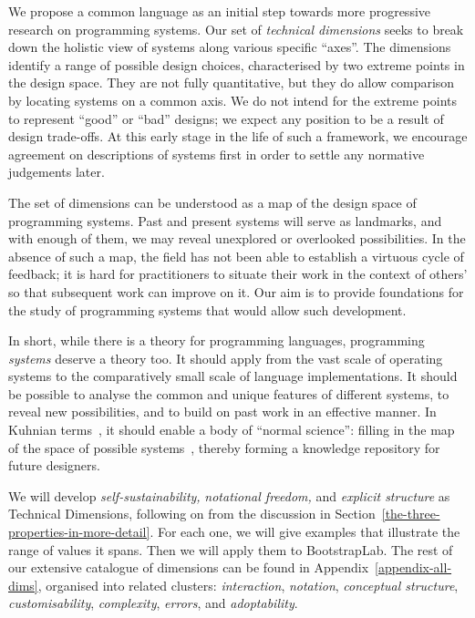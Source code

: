 \documentclass[ twoside,openright,titlepage,numbers=noenddot,headinclude,footinclude,cleardoublepage=empty,abstract=on,
                BCOR=5mm,paper=a4,fontsize=11pt
                ]{scrreprt}
\newcommand{\joel}[1]{}
\theoremstyle{definition}
\begin{document}
We propose a common language as an initial step towards more progressive
research on programming systems. Our set of \emph{technical dimensions}
seeks to break down the holistic view of systems along various specific
``axes''. The dimensions identify a range of possible design choices,
characterised by two extreme points in the design space. They are not
fully quantitative, but they do allow comparison by locating systems on
a common axis. We do not intend for the extreme points to represent
``good'' or ``bad'' designs; we expect any position to be a result of
design trade-offs. At this early stage in the life of such a framework,
we encourage agreement on descriptions of systems first in order to
settle any normative judgements later.

The set of dimensions can be understood as a map of the design space of
programming systems. Past and present systems will serve as landmarks,
and with enough of them, we may reveal unexplored or overlooked
possibilities. In the absence of such a map, the field has not been able
to establish a virtuous cycle of feedback; it is hard for practitioners
to situate their work in the context of others' so that subsequent work
can improve on it. Our aim is to provide foundations for the study of
programming systems that would allow such development.

In short, while there is a theory for programming languages, programming
\emph{systems} deserve a theory too. It should apply from the vast scale
of operating systems to the comparatively small scale of language
implementations. It should be possible to analyse the common and unique
features of different systems, to reveal new possibilities, and to build
on past work in an effective manner. In Kuhnian terms~\parencite{Kuhn},
it should enable a body of ``normal science'': filling in the map of the
space of possible systems~\joel{(Figure \ref{fig:tech-dims-diagram})},
thereby forming a knowledge repository for future designers.

\joel{CORRECTIONS NOTE: INCLUDE TECH DIMS DIAGRAM PICTURE FILE!!!}

We will develop \emph{self-sustainability,} \emph{notational freedom,}
and \emph{explicit structure} as Technical Dimensions, following on from
the discussion in Section~\ref{the-three-properties-in-more-detail}. For
each one, we will give examples that illustrate the range of values it
spans. Then we will apply them to BootstrapLab. The rest of our
extensive catalogue of dimensions can be found in
Appendix~\ref{appendix-all-dims}, organised into related clusters:
\emph{interaction}, \emph{notation}, \emph{conceptual structure},
\emph{customisability}, \emph{complexity}, \emph{errors}, and
\emph{adoptability}.
\end{document}
